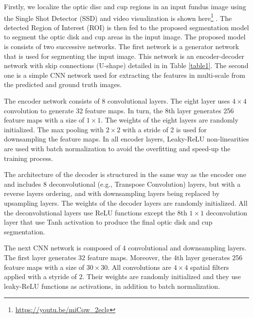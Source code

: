 \documentclass[runningheads,a4paper]{llncs}
\begin{document}
Firstly, we localize the optic disc and cup regions in an input fundus image using the Single Shot Detector  (SSD) \cite{liu2016ssd}  and video visualization is shown here\footnote{\url{https://youtu.be/miCqw_2eclg}} . The detected Region of Interest (ROI) is then fed to the proposed segmentation model to segment the optic disk and cup areas in the input image. The proposed model is consists of two successive networks. The first network is a generator network that is used for segmenting the input image. This network is an encoder-decoder network with skip connections (U-shape) detailed in in Table \ref{table1}. The second one is a simple CNN network used for extracting the features in multi-scale from the predicted and ground truth images.

The encoder network consists of 8 convolutional layers. The eight layer uses $4\times 4$ convolution to generate 32 feature maps. 
In turn, the 8th layer generates 256 feature maps with a size of $1\times 1$. The weights of the eight layers are randomly initialized. The max pooling with $2\times 2$ with a stride of 2 is used for downsampling the feature maps. In all encoder layers, Leaky-ReLU non-linearities are used with batch normalization to avoid the overfitting and speed-up the training process.


The architecture of the decoder is structured in the same way as the encoder one and includes 8 deconvolutional (e.g., Transpose Convolution) layers, but with a reverse layers ordering, and with downsampling layers being replaced by upsampling layers. The weights of the decoder layers are randomly initialized. All the deconvolutional layers use ReLU functions except the 8th $1\times 1$ deconvolution layer that use Tanh activation to produce the final optic disk and cup segmentation.

The next CNN network is composed of 4 convolutional and downsampling layers. The first layer generates 32 feature maps. Moreover, the 4th layer generates 256 feature maps with a size of $30\times 30$. All convolutions are $4\times 4$ spatial filters applied with a styride of $2$. Their weights are randomly initialized and they use leaky-ReLU functions as activations, in addition to batch normalization.
\end{document}
